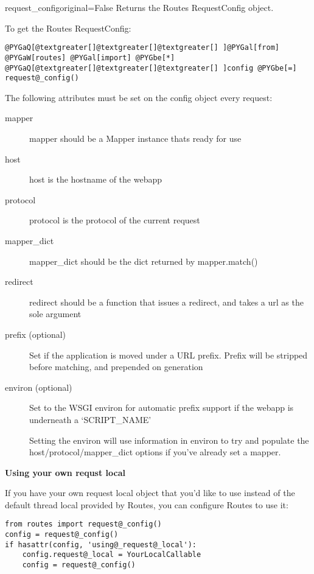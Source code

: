 \documentclass[letterpaper,10pt,english]{manual}
\begin{document}
\hypertarget{routes.request_config}{}\begin{funcdesc}{request\_config}{original=False}
Returns the Routes RequestConfig object.

To get the Routes RequestConfig:

\begin{Verbatim}[commandchars=@\[\]]
@PYGaQ[@textgreater[]@textgreater[]@textgreater[] ]@PYGal[from] @PYGaW[routes] @PYGal[import] @PYGbe[*]
@PYGaQ[@textgreater[]@textgreater[]@textgreater[] ]config @PYGbe[=] request@_config()
\end{Verbatim}

The following attributes must be set on the config object every request:
\begin{description}
\item[mapper]
mapper should be a Mapper instance thats ready for use

\item[host]
host is the hostname of the webapp

\item[protocol]
protocol is the protocol of the current request

\item[mapper\_dict]
mapper\_dict should be the dict returned by mapper.match()

\item[redirect]
redirect should be a function that issues a redirect, 
and takes a url as the sole argument

\item[prefix (optional)]
Set if the application is moved under a URL prefix. Prefix
will be stripped before matching, and prepended on generation

\item[environ (optional)]
Set to the WSGI environ for automatic prefix support if the
webapp is underneath a `SCRIPT\_NAME'

Setting the environ will use information in environ to try and
populate the host/protocol/mapper\_dict options if you've already
set a mapper.

\end{description}

\textbf{Using your own requst local}

If you have your own request local object that you'd like to use instead 
of the default thread local provided by Routes, you can configure Routes 
to use it:

\begin{Verbatim}[commandchars=@\[\]]
from routes import request@_config()
config = request@_config()
if hasattr(config, 'using@_request@_local'):
    config.request@_local = YourLocalCallable
    config = request@_config()
\end{Verbatim}


\end{funcdesc}
\end{document}
